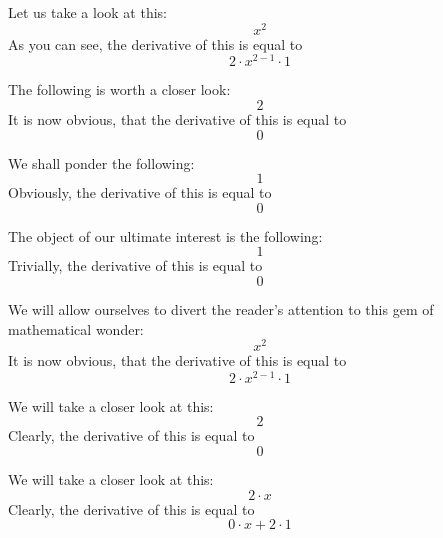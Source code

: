 \documentclass{article}
\begin{document}
Let us take a look at this:
\begin{equation}
x ^{2 } 
\end{equation}
As you can see, the derivative of this is equal to
\begin{equation}
2 \cdot x ^{2 - 1 } \cdot 1 
\end{equation}

The following is worth a closer look:
\begin{equation}
2 
\end{equation}
It is now obvious, that the derivative of this is equal to
\begin{equation}
0 
\end{equation}

We shall ponder the following:
\begin{equation}
1 
\end{equation}
Obviously, the derivative of this is equal to
\begin{equation}
0 
\end{equation}

The object of our ultimate interest is the following:
\begin{equation}
1 
\end{equation}
Trivially, the derivative of this is equal to
\begin{equation}
0 
\end{equation}

We will allow ourselves to divert the reader's attention to this gem of mathematical wonder:
\begin{equation}
x ^{2 } 
\end{equation}
It is now obvious, that the derivative of this is equal to
\begin{equation}
2 \cdot x ^{2 - 1 } \cdot 1 
\end{equation}

We will take a closer look at this:
\begin{equation}
2 
\end{equation}
Clearly, the derivative of this is equal to
\begin{equation}
0 
\end{equation}

We will take a closer look at this:
\begin{equation}
2 \cdot x 
\end{equation}
Clearly, the derivative of this is equal to
\begin{equation}
0 \cdot x + 2 \cdot 1 
\end{equation}
\end{document}
